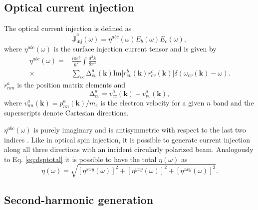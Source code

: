 \documentclass[pss]{wiley2sp} %
\begin{document}
\subsection{Optical current injection}\label{sec:theory-OCI}

The optical current injection is defined as
\begin{equation*}
\mathbf{\dot{J}}^{a}_{\text{inj}}(\omega) =
\eta^{abc}(\omega)E_{b}(\omega)E_{c}(\omega), \label{eq:eta}
\end{equation*}
where $\eta^{abc}(\omega)$ is the surface injection current tensor and is given by
\begin{align*}
\eta^{abc}(\omega) =& \frac{i\pi e^{3}}{\hbar^{2}}\int\frac{d^{3}k}{8\pi^{3}}
\nonumber \\
\times &
\sum_{vc}\mathrm{\Delta}^{a}_{cv}(\mathbf{k})\text{Im}\big[r^{b}_{cv}(\mathbf{k})
r^{c}_{cv}(\mathbf{k})\big]\delta(\omega_{cv}(\mathbf{k})-\omega).
\end{align*}
$r^{a}_{nm}$ is the position matrix elements and 
\begin{equation*}
\mathrm{\Delta}^{a}_{cv} = v^{a}_{cc}(\mathbf{k})-v^{a}_{vv}(\mathbf{k}),
\end{equation*}
where $v^{a}_{nn}(\mathbf{k})=p^{a}_{nn}(\mathbf{k})/m_{e}$ is the electron
velocity for a given $n$ band and the superscripts denote Cartesian
directions.

$\eta^{abc}(\omega)$ is purely imaginary and is antisymmetric with respect to
the last two indices \cite{sipePRB00,nastosPRB06}. Like in optical spin
injection, it is possible to generate current injection along all three
directions with an incident circularly polarized beam. Analogously to Eq.
\eqref{eq:dsptotal} it is possible to have the total $\eta(\omega)$ as
\begin{equation}\label{eq:etatotal}
\eta(\omega) =
\sqrt{[\eta^{xxy}(\omega)]^{2} +
      [\eta^{yxy}(\omega)]^{2} +
      [\eta^{zxy}(\omega)]^{2}
      }.
\end{equation}

\subsection{Second-harmonic generation}\label{sec:theory-SHG}
\end{document}
